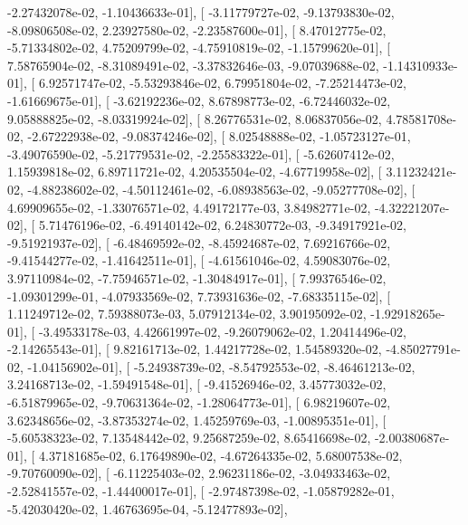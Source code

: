 \documentclass{article}
\begin{document}
         -2.27432078e-02,  -1.10436633e-01],
       [ -3.11779727e-02,  -9.13793830e-02,  -8.09806508e-02,
          2.23927580e-02,  -2.23587600e-01],
       [  8.47012775e-02,  -5.71334802e-02,   4.75209799e-02,
         -4.75910819e-02,  -1.15799620e-01],
       [  7.58765904e-02,  -8.31089491e-02,  -3.37832646e-03,
         -9.07039688e-02,  -1.14310933e-01],
       [  6.92571747e-02,  -5.53293846e-02,   6.79951804e-02,
         -7.25214473e-02,  -1.61669675e-01],
       [ -3.62192236e-02,   8.67898773e-02,  -6.72446032e-02,
          9.05888825e-02,  -8.03319924e-02],
       [  8.26776531e-02,   8.06837056e-02,   4.78581708e-02,
         -2.67222938e-02,  -9.08374246e-02],
       [  8.02548888e-02,  -1.05723127e-01,  -3.49076590e-02,
         -5.21779531e-02,  -2.25583322e-01],
       [ -5.62607412e-02,   1.15939818e-02,   6.89711721e-02,
          4.20535504e-02,  -4.67719958e-02],
       [  3.11232421e-02,  -4.88238602e-02,  -4.50112461e-02,
         -6.08938563e-02,  -9.05277708e-02],
       [  4.69909655e-02,  -1.33076571e-02,   4.49172177e-03,
          3.84982771e-02,  -4.32221207e-02],
       [  5.71476196e-02,  -6.49140142e-02,   6.24830772e-03,
         -9.34917921e-02,  -9.51921937e-02],
       [ -6.48469592e-02,  -8.45924687e-02,   7.69216766e-02,
         -9.41544277e-02,  -1.41642511e-01],
       [ -4.61561046e-02,   4.59083076e-02,   3.97110984e-02,
         -7.75946571e-02,  -1.30484917e-01],
       [  7.99376546e-02,  -1.09301299e-01,  -4.07933569e-02,
          7.73931636e-02,  -7.68335115e-02],
       [  1.11249712e-02,   7.59388073e-03,   5.07912134e-02,
          3.90195092e-02,  -1.92918265e-01],
       [ -3.49533178e-03,   4.42661997e-02,  -9.26079062e-02,
          1.20414496e-02,  -2.14265543e-01],
       [  9.82161713e-02,   1.44217728e-02,   1.54589320e-02,
         -4.85027791e-02,  -1.04156902e-01],
       [ -5.24938739e-02,  -8.54792553e-02,  -8.46461213e-02,
          3.24168713e-02,  -1.59491548e-01],
       [ -9.41526946e-02,   3.45773032e-02,  -6.51879965e-02,
         -9.70631364e-02,  -1.28064773e-01],
       [  6.98219607e-02,   3.62348656e-02,  -3.87353274e-02,
          1.45259769e-03,  -1.00895351e-01],
       [ -5.60538323e-02,   7.13548442e-02,   9.25687259e-02,
          8.65416698e-02,  -2.00380687e-01],
       [  4.37181685e-02,   6.17649890e-02,  -4.67264335e-02,
          5.68007538e-02,  -9.70760090e-02],
       [ -6.11225403e-02,   2.96231186e-02,  -3.04933463e-02,
         -2.52841557e-02,  -1.44400017e-01],
       [ -2.97487398e-02,  -1.05879282e-01,  -5.42030420e-02,
          1.46763695e-04,  -5.12477893e-02],
\end{document}
